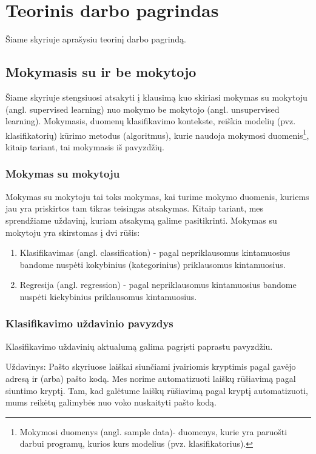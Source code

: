 \section{Teorinis darbo pagrindas}

Šiame skyriuje aprašysiu teorinį darbo pagrindą.

\subsection{Mokymasis su ir be mokytojo}

Šiame skyriuje stengsiuosi atsakyti į klausimą kuo skiriasi mokymas su
mokytoju (angl. supervised learning) nuo mokymo be mokytojo (angl.
unsupervised learning). Mokymasis, duomenų klasifikavimo kontekste, reiškia modelių
(pvz. klasifikatorių) kūrimo metodus (algoritmus), kurie naudoja
mokymosi duomenis\footnote{Mokymosi duomenys (angl. sample data)- duomenys,
kurie yra paruošti darbui programų, kurios kurs modelius (pvz.
klasifikatorius).}, kitaip tariant, tai mokymasis iš pavyzdžių.

\subsubsection{Mokymas su mokytoju}

Mokymas su mokytoju tai toks mokymas, kai turime mokymo duomenis, kuriems jau
yra priskirtos tam tikras teisingas atsakymas. Kitaip tariant, mes sprendžiame
uždavinį, kuriam atsakymą galime pasitikrinti. Mokymas su mokytoju yra
skirstomas į dvi rūšis:
\begin{enumerate}
  \item Klasifikavimas (angl. classification) - pagal nepriklausomus
  kintamuosius bandome nuspėti kokybinius (kategorinius) priklausomus kintamuosius. 
  \item Regresija (angl. regression) - pagal nepriklausomus kintamuosius bandome
  nuspėti kiekybinius priklausomus kintamuosius.
\end{enumerate} 

\subsubsection{Klasifikavimo uždavinio pavyzdys}

Klasifikavimo uždavinių aktualumą galima pagrįsti paprastu pavyzdžiu. 

Uždavinys: Pašto skyriuose laiškai siunčiami įvairiomis kryptimis pagal gavėjo
adresą ir (arba) pašto kodą. Mes norime automatizuoti laiškų rūšiavimą pagal
siuntimo kryptį. Tam, kad galėtume laiškų rūšiavimą pagal kryptį automatizuoti,
mums reikėtų galimybės nuo voko nuskaityti pašto kodą.

